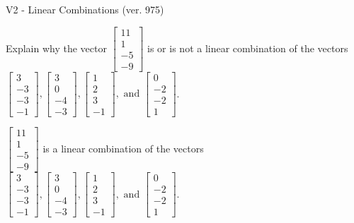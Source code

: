 \begin{exercise}
  \begin{exerciseTitle}V2 - Linear Combinations (ver. 975)\end{exerciseTitle}
  \begin{exerciseStatement}
    Explain why the vector \(\left[\begin{array}{c}
11 \\
1 \\
-5 \\
-9
\end{array}\right]\)  is or is not a linear 
	combination of the vectors \(\left[\begin{array}{c}
3 \\
-3 \\
-3 \\
-1
\end{array}\right] , \left[\begin{array}{c}
3 \\
0 \\
-4 \\
-3
\end{array}\right] , \left[\begin{array}{c}
1 \\
2 \\
3 \\
-1
\end{array}\right] , \text{ and } \left[\begin{array}{c}
0 \\
-2 \\
-2 \\
1
\end{array}\right]\).
	


  \end{exerciseStatement}
  \begin{exerciseAnswer}
   \(\left[\begin{array}{c}
11 \\
1 \\
-5 \\
-9
\end{array}\right]\) 
  	 is  
	a linear combination of the vectors \(\left[\begin{array}{c}
3 \\
-3 \\
-3 \\
-1
\end{array}\right] , \left[\begin{array}{c}
3 \\
0 \\
-4 \\
-3
\end{array}\right] , \left[\begin{array}{c}
1 \\
2 \\
3 \\
-1
\end{array}\right] , \text{ and } \left[\begin{array}{c}
0 \\
-2 \\
-2 \\
1
\end{array}\right]\).


\end{exerciseAnswer}
\end{exercise}

